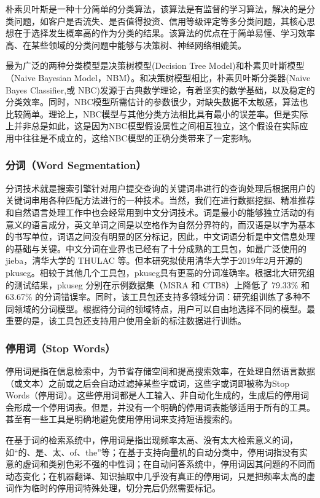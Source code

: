 \documentclass[UTF8]{ctexart}
\begin{document}
朴素贝叶斯是一种十分简单的分类算法，该算法是有监督的学习算法，解决的是分类问题，如客户是否流失、是否值得投资、信用等级评定等多分类问题，其核心思想在于选择发生概率高的作为分类的结果。该算法的优点在于简单易懂、学习效率高、在某些领域的分类问题中能够与决策树、神经网络相媲美。

最为广泛的两种分类模型是决策树模型(Decision Tree Model)和朴素贝叶斯模型（Naive Bayesian Model，NBM）。和决策树模型相比，朴素贝叶斯分类器(Naive Bayes Classifier,或 NBC)发源于古典数学理论，有着坚实的数学基础，以及稳定的分类效率。同时，NBC模型所需估计的参数很少，对缺失数据不太敏感，算法也比较简单。理论上，NBC模型与其他分类方法相比具有最小的误差率。但是实际上并非总是如此，这是因为NBC模型假设属性之间相互独立，这个假设在实际应用中往往是不成立的，这给NBC模型的正确分类带来了一定影响。\cite{lihang}
\subsubsection{分词（Word Segmentation）}
分词技术就是搜索引擎针对用户提交查询的关键词串进行的查询处理后根据用户的关键词串用各种匹配方法进行的一种技术。当然，我们在进行数据挖掘、精准推荐和自然语言处理工作中也会经常用到中文分词技术。词是最小的能够独立活动的有意义的语言成分，英文单词之间是以空格作为自然分界符的，而汉语是以字为基本的书写单位，词语之间没有明显的区分标记，因此，中文词语分析是中文信息处理的基础与关键。\cite{nlp}中文分词在业界也已经有了十分成熟的工具包，如最广泛使用的 jieba，清华大学的 THULAC 等。但本研究拟使用清华大学于2019年2月开源的pkuseg。相较于其他几个工具包，pkuseg具有更高的分词准确率。根据北大研究组的测试结果，pkuseg 分别在示例数据集（MSRA 和 CTB8）上降低了 79.33\% 和 63.67\% 的分词错误率。同时，该工具包还支持多领域分词：研究组训练了多种不同领域的分词模型。根据待分词的领域特点，用户可以自由地选择不同的模型。最重要的是，该工具包还支持用户使用全新的标注数据进行训练。\cite{pkuseg}
\subsubsection{停用词（Stop Words）}
停用词是指在信息检索中，为节省存储空间和提高搜索效率，在处理自然语言数据（或文本）之前或之后会自动过滤掉某些字或词，这些字或词即被称为Stop Words（停用词）。这些停用词都是人工输入、非自动化生成的，生成后的停用词会形成一个停用词表。但是，并没有一个明确的停用词表能够适用于所有的工具。甚至有一些工具是明确地避免使用停用词来支持短语搜索的。

在基于词的检索系统中，停用词是指出现频率太高、没有太大检索意义的词，如“的、是、太、of、the”等；在基于支持向量机的自动分类中，停用词指没有实意的虚词和类别色彩不强的中性词；在自动问答系统中，停用词因其问题的不同而动态变化；在机器翻译、知识抽取中几乎没有真正的停用词，只是把频率太高的虚词作为临时的停用词特殊处理，切分完后仍然需要标记。\cite{stopwords}
\end{document}
